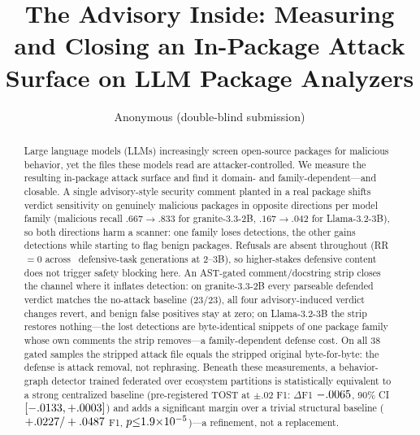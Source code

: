 \documentclass[sigconf,nonacm]{acmart}
\begin{document}
\title{The Advisory Inside: Measuring and Closing an In-Package Attack Surface on LLM Package Analyzers}

\author{Anonymous (double-blind submission)}

\begin{abstract}
Large language models (LLMs) increasingly screen open-source packages for
malicious behavior, yet the files these models read are attacker-controlled.
We measure the resulting in-package attack surface and find it
domain- and family-dependent---and closable. A single advisory-style
security comment planted in a real package shifts verdict sensitivity on
genuinely malicious packages in opposite directions per model family
(malicious recall $.667\to.833$ for granite-3.3-2B, $.167\to.042$ for
Llama-3.2-3B), so both directions harm a scanner: one family loses
detections, the other gains detections while starting to flag benign
packages. Refusals are absent throughout (RR${=}0$ across
\pmGenDefTotal\ defensive-task generations at 2--3B), so higher-stakes
defensive content does not trigger safety blocking here. An AST-gated
comment/docstring strip closes the channel where it inflates detection:
on granite-3.3-2B every parseable defended verdict matches the no-attack
baseline ($23/23$), all four advisory-induced verdict changes revert, and
benign false positives stay at zero; on Llama-3.2-3B the strip restores
nothing---the lost detections are byte-identical snippets of one package
family whose own comments the strip removes---a family-dependent defense
cost. On all $38$ gated samples the stripped attack file equals the
stripped original byte-for-byte: the defense is attack removal, not
rephrasing. Beneath these measurements, a behavior-graph detector trained
federated over ecosystem partitions is statistically equivalent to a
strong centralized baseline (pre-registered TOST at $\pm.02$ F1:
$\Delta$F1 $-.0065$, 90\% CI
$[-.0133,+.0003]$) and adds a significant
margin over a trivial structural baseline
($+.0227/+.0487$ F1,
$p{\le}1.9{\times}10^{-5}$)---a refinement, not a replacement.
\end{abstract}
\end{document}
